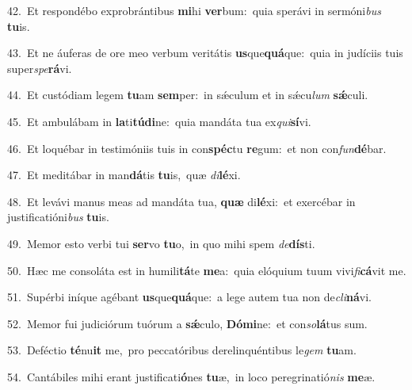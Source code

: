 {\numbfont\textcolor{\numbcolor}{42.}}~Et respondébo exprobrántibus \textbf{mi}\-hi \textbf{ver}\-bum:~\star quia sperávi in sermóni\textit{bus} \textbf{tu}\-is.\par
{\numbfont\textcolor{\numbcolor}{43.}}~Et ne áuferas de ore meo verbum veritátis \textbf{us}\-que\-\textbf{quá}\-que:~\star quia in judíciis tuis super\-\textit{spe}\-\textbf{rá}vi.\par
{\numbfont\textcolor{\numbcolor}{44.}}~Et custódiam legem \textbf{tu}\-am \textbf{sem}\-per:~\star in sǽculum et in sǽcu\textit{lum} \textbf{sǽ}\-culi.\par
{\numbfont\textcolor{\numbcolor}{45.}}~Et ambulábam in \textbf{la}\-ti\-\textbf{tú}\-\textbf{di}ne:~\star quia mandáta tua ex\-\textit{qui}\-\textbf{sí}vi.\par
{\numbfont\textcolor{\numbcolor}{46.}}~Et loquébar in testimóniis tuis in con\-\textbf{spéc}\-tu \textbf{re}\-gum:~\star et non con\-\textit{fun}\-\textbf{dé}bar.\par
{\numbfont\textcolor{\numbcolor}{47.}}~Et meditábar in man\-\textbf{dá}\-tis \textbf{tu}\-is,~\star quæ \textit{di}\-\textbf{lé}xi.\par
{\numbfont\textcolor{\numbcolor}{48.}}~Et levávi manus meas ad mandáta tua, \textbf{quæ} di\-\textbf{lé}\-xi:~\star et exercébar in justificatióni\textit{bus} \textbf{tu}\-is.\par
{\numbfont\textcolor{\numbcolor}{49.}}~Memor esto verbi tui \textbf{ser}\-vo \textbf{tu}\-o,~\star in quo mihi spem \textit{de}\-\textbf{dís}ti.\par
{\numbfont\textcolor{\numbcolor}{50.}}~Hæc me consoláta est in humili\-\textbf{tá}\-te \textbf{me}\-a:~\star quia elóquium tuum vivi\-\textit{fi}\-\textbf{cá}vit me.\par
{\numbfont\textcolor{\numbcolor}{51.}}~Supérbi iníque agébant \textbf{us}\-que\-\textbf{quá}\-que:~\star a lege autem tua non de\-\textit{cli}\-\textbf{ná}vi.\par
{\numbfont\textcolor{\numbcolor}{52.}}~Memor fui judiciórum tuórum a \textbf{sǽ}\-culo, \textbf{Dó}\-\textbf{mi}ne:~\star et con\-\textit{so}\-\textbf{lá}tus sum.\par
{\numbfont\textcolor{\numbcolor}{53.}}~Deféctio \textbf{té}\-nu\textbf{it} me,~\star pro peccatóribus derelinquéntibus le\textit{gem} \textbf{tu}\-am.\par
{\numbfont\textcolor{\numbcolor}{54.}}~Cantábiles mihi erant justificati\-\textbf{ó}\-nes \textbf{tu}\-æ,~\star in loco peregrinatió\textit{nis} \textbf{me}\-æ.\par
